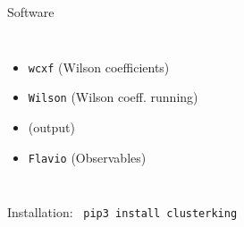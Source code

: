 \begin{frame}{Software}
\begin{columns}
\begin{itemize}
            \item {} \texttt{wcxf} {\footnotesize(Wilson coefficients)}
            \item {} \texttt{Wilson} {\footnotesize(Wilson coeff. running)}
            \item 
             {\footnotesize (output)}
            \item {} \texttt{Flavio} {\footnotesize(Observables)}
        \end{itemize}
     \end{columns}
     
     \vspace{0.3cm}
     \begin{center}
         Installation: \ {\color{purple}\texttt{pip3 install clusterking}}
    \end{center}
\end{frame}

